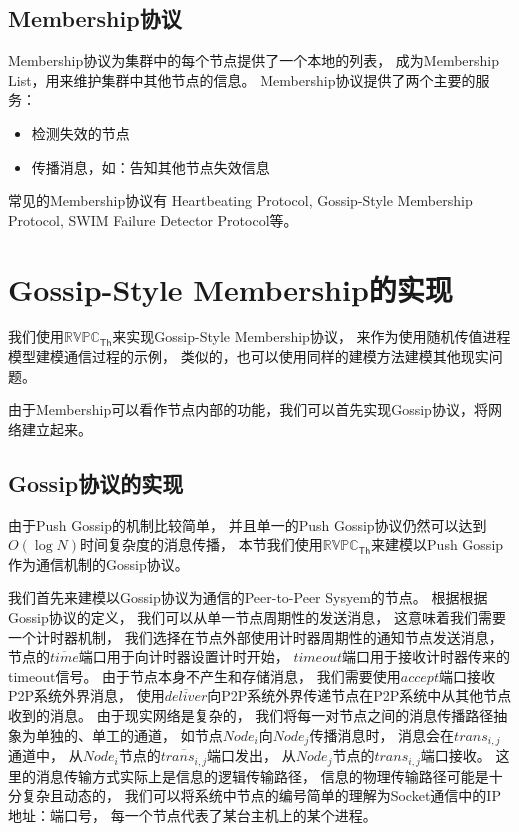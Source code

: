\subsection{Membership协议}

Membership协议为集群中的每个节点提供了一个本地的列表，
成为Membership List，用来维护集群中其他节点的信息。
Membership协议提供了两个主要的服务：
\begin{itemize}
   \item 检测失效的节点
   \item 传播消息，如：告知其他节点失效信息
\end{itemize}

常见的Membership协议有
Heartbeating Protocol, 
Gossip-Style Membership Protocol, 
SWIM Failure Detector Protocol等。

\section{Gossip-Style Membership的实现}
我们使用$\mathbb{RVPC}_{\mathsf{Th}}$来实现Gossip-Style Membership协议，
来作为使用随机传值进程模型建模通信过程的示例，
类似的，也可以使用同样的建模方法建模其他现实问题。

由于Membership可以看作节点内部的功能，我们可以首先实现Gossip协议，将网络建立起来。

\subsection{Gossip协议的实现}\label{ch:gossip_impl}
由于Push Gossip的机制比较简单，
并且单一的Push Gossip协议仍然可以达到$O(\log N)$时间复杂度的消息传播，
本节我们使用$\mathbb{RVPC}_{\mathsf{Th}}$来建模以Push Gossip作为通信机制的Gossip协议。

我们首先来建模以Gossip协议为通信的Peer-to-Peer Sysyem的节点。
根据根据Gossip协议的定义，
我们可以从单一节点周期性的发送消息，
这意味着我们需要一个计时器机制，
我们选择在节点外部使用计时器周期性的通知节点发送消息，
节点的$\overline{time}$端口用于向计时器设置计时开始，
$timeout$端口用于接收计时器传来的timeout信号。
由于节点本身不产生和存储消息，
我们需要使用$accept$端口接收P2P系统外界消息，
使用$\overline{deliver}$向P2P系统外界传递节点在P2P系统中从其他节点收到的消息。
由于现实网络是复杂的，
我们将每一对节点之间的消息传播路径抽象为单独的、单工的通道，
如节点$Node_i$向$Node_j$传播消息时，
消息会在$trans_{i,j}$通道中，
从$Node_i$节点的$\overline{trans_{i,j}}$端口发出，
从$Node_j$节点的$trans_{i,j}$端口接收。
这里的消息传输方式实际上是信息的逻辑传输路径，
信息的物理传输路径可能是十分复杂且动态的，
我们可以将系统中节点的编号简单的理解为Socket通信中的IP地址：端口号，
每一个节点代表了某台主机上的某个进程。

